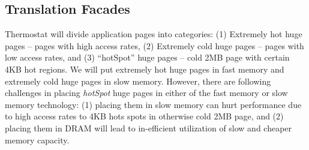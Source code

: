 %
%
\subsection{Translation Facades}
Thermostat will divide application pages into categories: (1) Extremely hot huge
pages -- pages with high access rates, (2) Extremely cold huge pages -- pages
with low access rates, and (3) ``hotSpot'' huge pages -- cold 2MB page with
certain 4KB hot regions. We will put extremely hot huge pages in fast memory and
extremely cold huge pages in slow memory. However, there are following
challenges in placing {\it hotSpot} huge pages in either of the fast memory or
slow memory technology: (1) placing them in slow memory can hurt performance due
to high access rates to 4KB hots spots in otherwise cold 2MB page, and (2)
placing them in DRAM will lead to in-efficient utilization of slow and cheaper
memory capacity.
%

